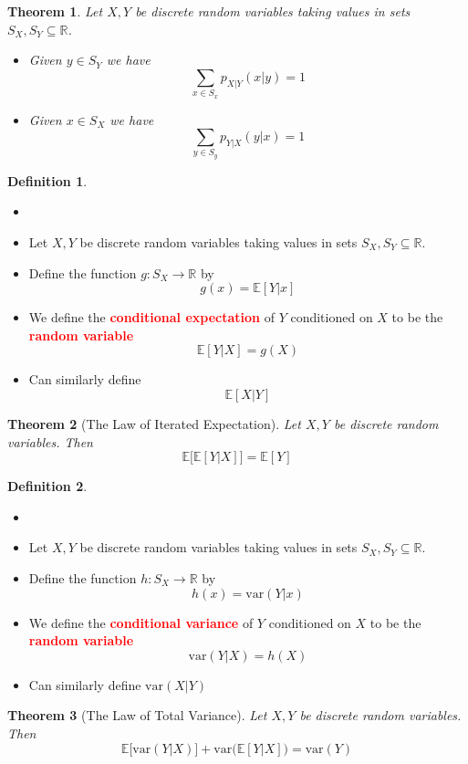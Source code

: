 \documentclass{article}
\newcommand{\R}{\mathbb{R}}
\newcommand{\E}{\mathbb{E}}
\newcommand{\var}{\text{var}}
\newcommand{\bfred}[1]{\textcolor{red}{\textbf{#1}}}
\theoremstyle{plain}
\newtheorem{thm}{Theorem}[section]
\theoremstyle{definition}
\newtheorem{defn}{Definition}[section]
\theoremstyle{remark}
\begin{document}
\begin{thm}
    Let $X,Y$ be discrete random variables taking values in sets $S_X,S_Y\subseteq\R$.
    \begin{itemize}
        \item Given $y\in S_Y$ we have \[\sum_{x\in S_x}p_{X|Y}(x|y)=1\]
        \item Given $x\in S_X$ we have \[\sum_{y\in S_y}p_{Y|X}(y|x)=1\]
    \end{itemize}
\end{thm}

\begin{defn}
    \begin{itemize}
        \item []
        \item Let $X,Y$ be discrete random variables taking values in sets $S_X,S_Y\subseteq\R$.
        \item Define the function $g:S_X\rightarrow\R$ by \[g(x)=\E[Y|x]\] 
        \item We define the \bfred{conditional expectation} of $Y$ conditioned on $X$ to be the \bfred{random variable} \[\E[Y|X]=g(X)\] 
        \item Can similarly define \[\E[X|Y]\]
    \end{itemize}
\end{defn}

\begin{thm}[The Law of Iterated Expectation]
    Let $X,Y$ be discrete random variables. Then \[\E\bigr[\E[Y|X]\bigr]=\E[Y]\]
\end{thm}

\begin{defn}
    \begin{itemize}
        \item []
        \item Let $X,Y$ be discrete random variables taking values in sets $S_X,S_Y\subseteq\R$.
        \item Define the function $h:S_X\rightarrow\R$ by \[h(x)=\var(Y|x)\] 
        \item We define the \bfred{conditional variance} of $Y$ conditioned on $X$ to be the \bfred{random variable} \[\var(Y|X)=h(X)\] 
        \item Can similarly define $\var(X|Y)$
    \end{itemize}
\end{defn}

\begin{thm}[The Law of Total Variance]
    Let $X,Y$ be discrete random variables. Then \[\E\bigr[\var(Y|X)\bigr]+\var\bigr(\E[Y|X]\bigr)=\var(Y)\]
\end{thm}
\end{document}
